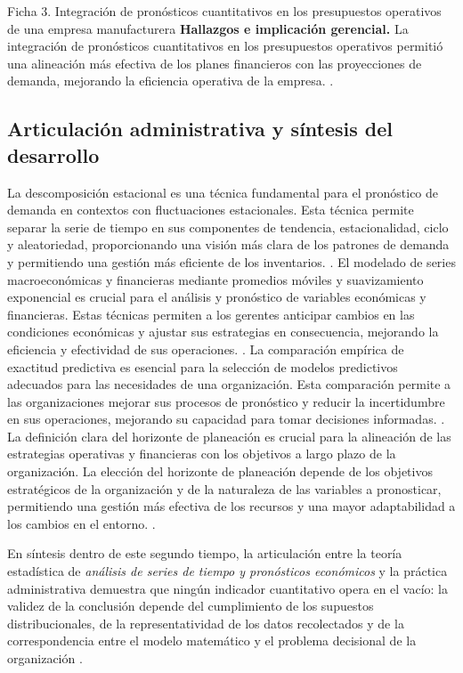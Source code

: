 {\begin{fichainvestigacion}{Ficha 3. Integración de pronósticos cuantitativos en los presupuestos operativos de una empresa manufacturera}
\textbf{Hallazgos e implicación gerencial.} La integración de pronósticos cuantitativos en los presupuestos operativos permitió una alineación más efectiva de los planes financieros con las proyecciones de demanda, mejorando la eficiencia operativa de la empresa. \citep{nistHandbook}.
\end{fichainvestigacion}


\subsection{Articulación administrativa y síntesis del desarrollo}
La descomposición estacional es una técnica fundamental para el pronóstico de demanda en contextos con fluctuaciones estacionales. Esta técnica permite separar la serie de tiempo en sus componentes de tendencia, estacionalidad, ciclo y aleatoriedad, proporcionando una visión más clara de los patrones de demanda y permitiendo una gestión más eficiente de los inventarios. \citep{holmesBusiness2023,nistHandbook}.
El modelado de series macroeconómicas y financieras mediante promedios móviles y suavizamiento exponencial es crucial para el análisis y pronóstico de variables económicas y financieras. Estas técnicas permiten a los gerentes anticipar cambios en las condiciones económicas y ajustar sus estrategias en consecuencia, mejorando la eficiencia y efectividad de sus operaciones. \citep{holmesBusiness2023,nistHandbook}.
La comparación empírica de exactitud predictiva es esencial para la selección de modelos predictivos adecuados para las necesidades de una organización. Esta comparación permite a las organizaciones mejorar sus procesos de pronóstico y reducir la incertidumbre en sus operaciones, mejorando su capacidad para tomar decisiones informadas. \citep{holmesBusiness2023,nistHandbook}.
La definición clara del horizonte de planeación es crucial para la alineación de las estrategias operativas y financieras con los objetivos a largo plazo de la organización. La elección del horizonte de planeación depende de los objetivos estratégicos de la organización y de la naturaleza de las variables a pronosticar, permitiendo una gestión más efectiva de los recursos y una mayor adaptabilidad a los cambios en el entorno. \citep{holmesBusiness2023,nistHandbook}.

En síntesis dentro de este segundo tiempo, la articulación entre la teoría estadística de \textit{análisis de series de tiempo y pronósticos económicos} y la práctica administrativa demuestra que ningún indicador cuantitativo opera en el vacío: la validez de la conclusión depende del cumplimiento de los supuestos distribucionales, de la representatividad de los datos recolectados y de la correspondencia entre el modelo matemático y el problema decisional de la organización \citep{anderson2012,nistHandbook,guarin2002}.

}
